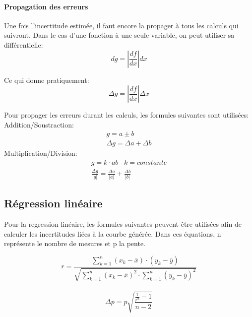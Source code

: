 \paragraph{Propagation des erreurs}
Une fois l'incertitude estimée, il faut encore la propager à tous les calculs qui suivront. Dans le cas d'une fonction à une seule variable, on peut utiliser sa différentielle:
\begin{equation}
    dg=|{\frac{df}{dx}}|dx
\end{equation}

Ce qui donne pratiquement:
\begin{equation}
    \Delta g=|\frac{df}{dx}|\Delta x
\end{equation}

Pour propager les erreurs durant les calculs, les formules suivantes sont utilisées:\\
Addition/Soustraction:
\begin{equation}
    \begin{split}
	g = a \pm b\\
	\Delta g = \Delta a + \Delta b
    \end{split}
\end{equation}
Multiplication/Division:
\begin{equation}
    \label{multdiv}
    \begin{split}
	g = k\cdot ab \;\;\; k=constante\\
	\frac{\Delta g}{|g|} = \frac{\Delta a}{|a|} + \frac{\Delta b}{|b|}
    \end{split}
\end{equation}

\subsection{Régression linéaire}

Pour la regression linéaire, les formules suivantes peuvent être utilisées afin de calculer les incertitudes liées à la courbe générée.
Dans ces équations, n représente le nombre de mesures et p la pente.

\begin{equation}
    \label{regressionr}
    r=\frac{\sum_{k=1}^{n}(x_k-\bar{x})\cdot(y_k-\bar{y})}{\sqrt{\sum_{k=1}^{n}(x_k-\bar{x})^2\cdot\sum_{k=1}^{n}(y_k-\bar{y})^2}}
\end{equation}
\\

\begin{equation}
    \label{deltam}
    \Delta p=p\sqrt{\frac{\frac{1}{r^2}-1}{n-2}}
\end{equation}
